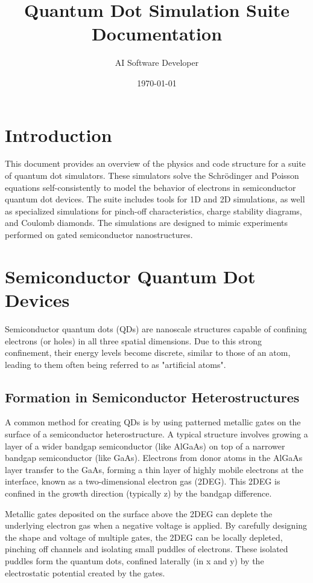 \documentclass{article}
\title{Quantum Dot Simulation Suite Documentation}
\author{AI Software Developer}
\date{\today}
\begin{document}
\maketitle
\tableofcontents
\newpage

\section{Introduction}
This document provides an overview of the physics and code structure for a suite of quantum dot simulators. These simulators solve the Schrödinger and Poisson equations self-consistently to model the behavior of electrons in semiconductor quantum dot devices. The suite includes tools for 1D and 2D simulations, as well as specialized simulations for pinch-off characteristics, charge stability diagrams, and Coulomb diamonds. The simulations are designed to mimic experiments performed on gated semiconductor nanostructures.

\section{Semiconductor Quantum Dot Devices}
Semiconductor quantum dots (QDs) are nanoscale structures capable of confining electrons (or holes) in all three spatial dimensions. Due to this strong confinement, their energy levels become discrete, similar to those of an atom, leading to them often being referred to as "artificial atoms".

\subsection{Formation in Semiconductor Heterostructures}
A common method for creating QDs is by using patterned metallic gates on the surface of a semiconductor heterostructure. A typical structure involves growing a layer of a wider bandgap semiconductor (like AlGaAs) on top of a narrower bandgap semiconductor (like GaAs). Electrons from donor atoms in the AlGaAs layer transfer to the GaAs, forming a thin layer of highly mobile electrons at the interface, known as a two-dimensional electron gas (2DEG). This 2DEG is confined in the growth direction (typically z) by the bandgap difference.

Metallic gates deposited on the surface above the 2DEG can deplete the underlying electron gas when a negative voltage is applied. By carefully designing the shape and voltage of multiple gates, the 2DEG can be locally depleted, pinching off channels and isolating small puddles of electrons. These isolated puddles form the quantum dots, confined laterally (in x and y) by the electrostatic potential created by the gates.
\end{document}
